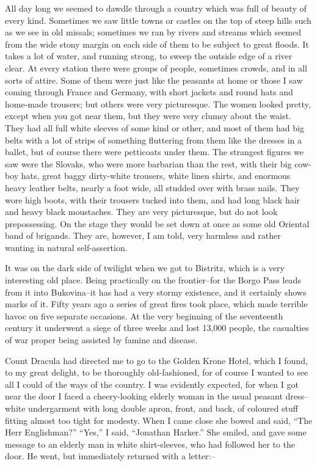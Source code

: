 \documentclass[12pt,openright]{book}
\begin{document}
All day long we seemed to dawdle through a country which was full of beauty of every kind. Sometimes we saw little towns or castles on the top of steep hills such as we see in old missals; sometimes we ran by rivers and streams which seemed from the wide stony margin on each side of them to be subject to great floods. It takes a lot of water, and running strong, to sweep the outside edge of a river clear. At every station there were groups of people, sometimes crowds, and in all sorts of attire. Some of them were just like the peasants at home or those I saw coming through France and Germany, with short jackets and round hats and home-made trousers; but others were very picturesque. The women looked pretty, except when you got near them, but they were very clumsy about the waist. They had all full white sleeves of some kind or other, and most of them had big belts with a lot of strips of something fluttering from them like the dresses in a ballet, but of course there were petticoats under them. The strangest figures we saw were the Slovaks, who were more barbarian than the rest, with their big cow-boy hats, great baggy dirty-white trousers, white linen shirts, and enormous heavy leather belts, nearly a foot wide, all studded over with brass nails. They wore high boots, with their trousers tucked into them, and had long black hair and heavy black moustaches. They are very picturesque, but do not look prepossessing. On the stage they would be set down at once as some old Oriental band of brigands. They are, however, I am told, very harmless and rather wanting in natural self-assertion.

It was on the dark side of twilight when we got to Bistritz, which is a very interesting old place. Being practically on the frontier–for the Borgo Pass leads from it into Bukovina–it has had a very stormy existence, and it certainly shows marks of it. Fifty years ago a series of great fires took place, which made terrible havoc on five separate occasions. At the very beginning of the seventeenth century it underwent a siege of three weeks and lost 13,000 people, the casualties of war proper being assisted by famine and disease.

Count Dracula had directed me to go to the Golden Krone Hotel, which I found, to my great delight, to be thoroughly old-fashioned, for of course I wanted to see all I could of the ways of the country. I was evidently expected, for when I got near the door I faced a cheery-looking elderly woman in the usual peasant dress–white undergarment with long double apron, front, and back, of coloured stuff fitting almost too tight for modesty. When I came close she bowed and said, “The Herr Englishman?” “Yes,” I said, “Jonathan Harker.” She smiled, and gave some message to an elderly man in white shirt-sleeves, who had followed her to the door. He went, but immediately returned with a letter:–
\end{document}
